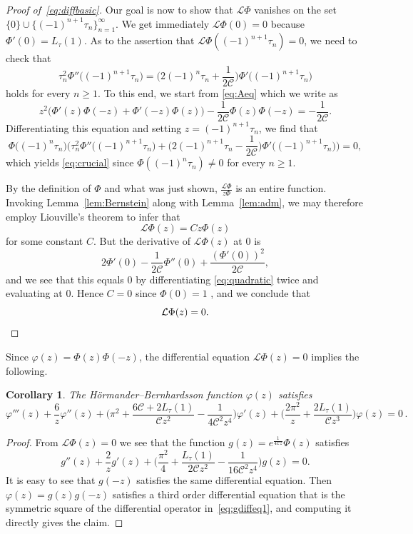 \documentclass[12pt]{amsart}
\theoremstyle{plain}
\newtheorem{corollary}[theorem]{Corollary}
\numberwithin{equation}{section}
\theoremstyle{definition}
\renewcommand{\phi}{\varphi}
\newcommand{\Cone}{\mathscr{C}}
\begin{document}
\begin{proof}[Proof of~\eqref{eq:diffbasic}]
Our goal is now to show that $\mathcal{L} \Phi$ vanishes on the set $\{0\}\cup\{(-1)^{n+1}\tau_n\}_{n=1}^\infty$. We get immediately $\mathcal{L}\Phi(0)=0$ because $\Phi'(0)=L_\tau(1)$. As to the assertion that $\mathcal{L}\Phi((-1)^{n+1}\tau_n)=0$, we need to check that
\begin{equation} \label{eq:crucial} \tau_n^2 \Phi''\big((-1)^{n+1}\tau_n\big)=\Big(2(-1)^{n}\tau_n+\frac{1}{2\Cone}\Big) \Phi'\big((-1)^{n+1}\tau_n\big) \end{equation}
holds for every $n\ge 1$. To this end, we start from \eqref{eq:Aeq} which we write as
\begin{equation} \label{eq:quadratic} z^2 \big(\Phi'(z)\Phi(-z)+\Phi'(-z)\Phi(z)\big)-\frac{1}{2\Cone} \Phi(z)\Phi(-z)=-\frac{1}{2\Cone}. \end{equation}
Differentiating this equation and setting $z=(-1)^{n+1}\tau_n$, we find that
\[ \Phi\big((-1)^n \tau_n\big)\Big(\tau_n^2 \Phi''\big((-1)^{n+1} \tau_n \big)+\big(2(-1)^{n+1}\tau_n-\frac{1}{2\Cone}\big)\Phi'\big((-1)^{n+1} \tau_n \big)\Big)=0,  \]
which yields \eqref{eq:crucial} since $\Phi((-1)^n\tau_n)\neq 0$ for every $n\ge 1$.

By the definition of $\Phi$ and what was just shown, $\frac{\mathcal{L}\Phi}{z\Phi}$ is an entire function. Invoking
Lemma~\ref{lem:Bernstein} along with Lemma~\ref{lem:adm}, we may therefore employ Liouville's theorem to infer that
\[ \mathcal{L} \Phi (z)= C z \Phi(z) \]
for some constant $C$. But the derivative of  $\mathcal{L} \Phi (z)$ at $0$ is
\[ 2\Phi'(0)-\frac{1}{2\Cone}\Phi''(0)+\frac{(\Phi'(0))^2}{2\Cone}, \]
and we see that this equals $0$ by differentiating  \eqref{eq:quadratic} twice and evaluating at $0$. Hence $C=0$ since $\Phi(0)=1$ , and we conclude that
	\[ \mathcal{L} \Phi (z)=0. \qedhere \]
\end{proof}
Since $\phi(z)=\Phi(z)\Phi(-z)$, the differential equation $ \mathcal{L} \Phi (z)=0$ implies the following.
\begin{corollary}\label{cor:thirdorder}
The H\"ormander--Bernhardsson function $\phi(z)$ satisfies
	\[\phi'''(z) + \frac6z\phi''(z) +
	\Big(\pi^2+\frac{6\Cone+2L_{\tau}(1)}{\Cone
		z^2}-\frac{1}{4\Cone^2z^4}\Big)\phi'(z) +
	\Big(\frac{2\pi^2}{z}+\frac{2L_{\tau}(1)}{\Cone z^3}\Big)\phi(z)= 0\,. \]
\end{corollary}
\begin{proof}
	From $\mathcal{L}\Phi(z)=0$ we see that the function $g(z)=e^{\frac{1}{4\Cone z}}\Phi(z)$ satisfies
	\begin{equation}\label{eq:gdiffeq1}
		g''(z)+\frac{2}{z}g'(z) + \Big(\frac{\pi^2}{4}+\frac{L_{\tau}(1)}{2\Cone z^2}-\frac{1}{16\Cone ^2z^4}\Big)g(z) 
		= 0.
	\end{equation}
	It is easy to see that $g(-z)$ satisfies the same differential equation. Then $\phi(z)=g(z)g(-z)$ satisfies a third order differential equation that is the symmetric square of the differential operator in~\eqref{eq:gdiffeq1}, and computing it directly gives the claim.
\end{proof}
\end{document}
